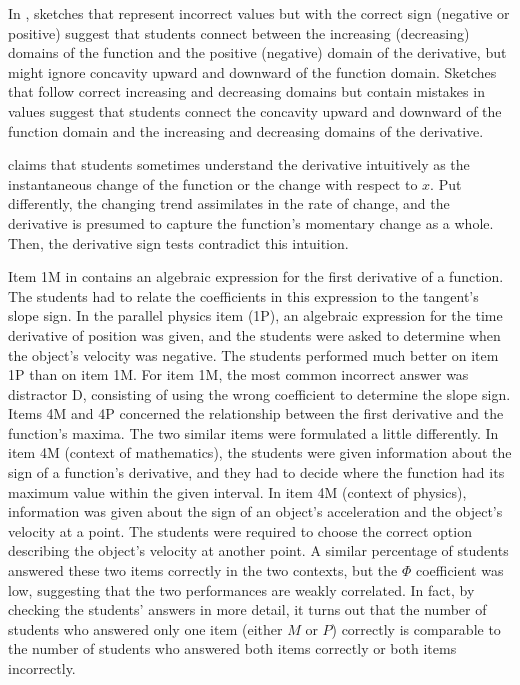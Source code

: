 \documentclass[11pt]{book}
\begin{document}
In \cite{nagari14constrained}, sketches that represent incorrect
values but with the correct sign (negative or positive) suggest that
students connect between the increasing (decreasing) domains of the
function and the positive (negative) domain of the derivative, but
might ignore concavity upward and downward of the function domain.
Sketches that follow correct increasing and decreasing domains but
contain mistakes in values suggest that students connect the concavity
upward and downward of the function domain and the increasing and
decreasing domains of the derivative.

\cite{kartal2019mathematical} claims that students sometimes understand
the derivative intuitively as the \textquotedbl instantaneous change\textquotedbl{}
of the function or \textquotedbl the change with respect to $x$.\textquotedbl{}
Put differently, the changing trend assimilates in the rate of change,
and the derivative is presumed to capture the function's momentary
change as a whole. Then, the derivative sign tests contradict this
intuition.

Item 1M in \cite{carli2020testing} contains an algebraic expression
for the first derivative of a function. The students had to relate
the coefficients in this expression to the tangent's slope sign. In
the parallel physics item (1P), an algebraic expression for the time
derivative of position was given, and the students were asked to determine
when the object's velocity was negative. The students performed much
better on item 1P than on item 1M. For item 1M, the most common incorrect
answer was distractor D, consisting of using the wrong coefficient
to determine the slope sign. Items 4M and 4P concerned the relationship
between the first derivative and the function's maxima. The two similar
items were formulated a little differently. In item 4M (context of
mathematics), the students were given information about the sign of
a function's derivative, and they had to decide where the function
had its maximum value within the given interval. In item 4M (context
of physics), information was given about the sign of an object's acceleration
and the object's velocity at a point. The students were required to
choose the correct option describing the object's velocity at another
point. A similar percentage of students answered these two items correctly
in the two contexts, but the $\Phi$ coefficient was low, suggesting
that the two performances are weakly correlated. In fact, by checking
the students' answers in more detail, it turns out that the number
of students who answered only one item (either $M$ or $P$) correctly
is comparable to the number of students who answered both items correctly
or both items incorrectly.
\end{document}
